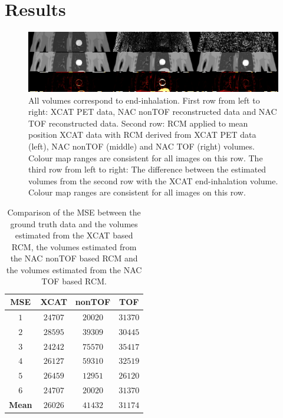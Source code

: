 \documentclass{IEEEtran}
\begin{document}
\section{Results}
\begin{figure}
    \centering
    \includegraphics[width=0.9\linewidth]{figures/output.png}
    \caption{All volumes correspond to end-inhalation. First row from left to right: XCAT PET data, NAC nonTOF reconstructed data and NAC TOF reconstructed data. Second row: RCM applied to mean position XCAT data with RCM derived from XCAT PET data (left), NAC nonTOF (middle) and NAC TOF (right) volumes. Colour map ranges are consistent for all images on this row. The third row from left to right: The difference between the estimated volumes from the second row with the XCAT end-inhalation volume. Colour map ranges are consistent for all images on this row.}
    \label{fig:output}
\end{figure}

\begin{table}
    \centering
    \small
        \caption{Comparison of the MSE between the ground truth data and the volumes estimated from the XCAT based RCM, the volumes estimated from the NAC nonTOF based RCM and the volumes estimated from the NAC TOF based RCM.}
    \begin{tabular}{||c|ccc||}
    \hline
        \textbf{MSE}    & \textbf{XCAT} & \textbf{nonTOF}   & \textbf{TOF}  \\
    \hline
        \textbf{$1$}    & $24707$       & $20020$           & $31370$       \\
        \textbf{$2$}    & $28595$       & $39309$           & $30445$       \\
        \textbf{$3$}    & $24242$       & $75570$           & $35417$       \\
        \textbf{$4$}    & $26127$       & $59310$           & $32519$       \\
        \textbf{$5$}    & $26459$       & $12951$           & $26120$       \\
        \textbf{$6$}    & $24707$       & $20020$           & $31370$       \\
    \hline
        \textbf{Mean}   & $26026$       & $41432$           & $31174$       \\
    \hline
    \end{tabular}
    \label{tab:mse}
\end{table}
\end{document}
